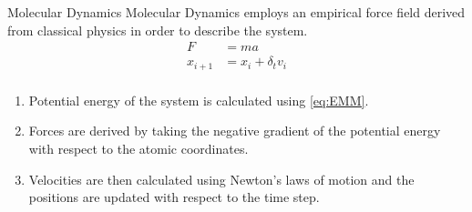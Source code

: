 \begin{frame}{Molecular Dynamics}
Molecular Dynamics employs an empirical force field derived from classical physics in order to describe the system.
\begin{equation}
\label{eq:EMM2}
\begin{split}
F &= m a \\
x_{i+1} &= x_i +\delta_t v_i \\
\end{split}
\end{equation}
\begin{enumerate}
\item Potential energy of the system is calculated using \cref{eq:EMM}.
\item Forces are derived by taking the negative gradient of the potential energy with respect to the atomic coordinates.
\item Velocities are then calculated using Newton's laws of motion and the positions are updated with respect to the time step.
\end{enumerate}

\end{frame}